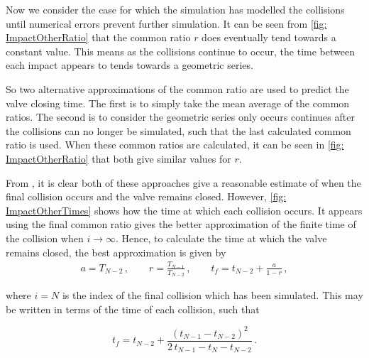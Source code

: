 Now we consider the case for which the simulation has modelled the collisions until numerical errors prevent further simulation. It can be seen from \cref{fig: ImpactOtherRatio} that the common ratio $r$ does eventually tend towards a constant value. This means as the collisions continue to occur, the time between each impact appears to tends towards a geometric series. 

So two alternative approximations of the common ratio are used to predict the valve closing time. The first is to simply take the mean average of the common ratios. The second is to consider the geometric series only occurs continues after the collisions can no longer be simulated, such that the last calculated common ratio is used.%
When these common ratios are calculated, it can be seen in \cref{fig: ImpactOtherRatio} that both give similar values for $r$.

\newpage
From , it is clear both of these approaches give a reasonable estimate of when the final collision occurs and the valve remains closed. However, \cref{fig: ImpactOtherTimes} shows how the time at which each collision occurs. It appears using the final common ratio gives the better approximation of the finite time of the collision when $i \rightarrow \infty$. Hence, to calculate the time at which the valve remains closed, the best approximation is given by
~
\begin{equation*}
\begin{split}
    a = T_{N-2} \, , \qquad %
    r = \frac{T_{N-1}}{T_{N-2}} \, , \qquad %
    t_f = t_{N-2} + \frac{a}{1-r} \, ,
\end{split}
\end{equation*}

where $i = N$ is the index of the final collision which has been simulated. This may be written in terms of the time of each collision, such that

\begin{equation*}
    t_f = t_{N-2} + \frac{\left( t_{N-1} - t_{N-2} \right)^2}{2 \, t_{N-1} - t_N - t_{N-2}} \, .
\end{equation*}